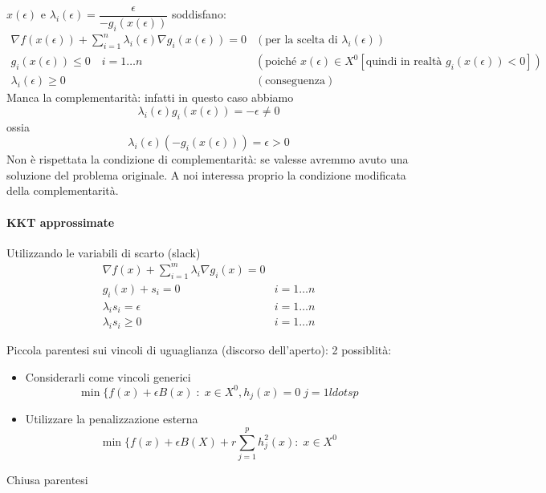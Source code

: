  $x(\epsilon)$ e $\lambda_i(\epsilon) =  \dfrac{\epsilon}{-g_i(x(\epsilon))}$
soddisfano:
$$ 
\begin{array}{ll}
\nabla f(x(\epsilon)) + \displaystyle \sum_{i=1}^{n}
\lambda_i(\epsilon) \nabla g_i(x(\epsilon)) = 0
& (\text{per la scelta di }\lambda_i(\epsilon)) \\
 g_i(x(\epsilon)) \leq 0 \quad i=1\ldots n  &
( \text{poich\'e } x(\epsilon) \in X^{0} [\text{quindi in realt\`a } g_i(x(\epsilon))<0 ]) \\
 \lambda_i(\epsilon) \geq 0   &  (\text{conseguenza})
\end{array}
$$
Manca la complementarit\`a: infatti in questo caso abbiamo
$$ \lambda_i(\epsilon) g_i(x(\epsilon)) = - \epsilon \neq 0 $$
ossia
$$ \lambda_i(\epsilon)(-g_i(x(\epsilon))) = \epsilon > 0$$
Non \`e  rispettata la condizione di complementarit\`a: se valesse
avremmo avuto una soluzione del problema originale.
A noi interessa proprio la condizione modificata della complementarit\`a.
\paragraph{KKT approssimate}
Utilizzando le variabili di scarto (slack)
 $$
\begin{array}{ll}
\nabla f(x) + \displaystyle \sum_{i=1}^{m} \lambda_i \nabla g_i(x) = 0  & \\
 g_i(x) + s_i = 0  &    i=1 \ldots n \\
 \lambda_i s_i = \epsilon &  i =1 \ldots n \\
  \lambda_i s_i \geq 0 \quad &  i= 1 \ldots n
\end{array}
$$

\begin{observation}
Piccola parentesi sui vincoli di uguaglianza (discorso dell'aperto):
2 possiblit\`a:
\begin{itemize}
\item Considerarli come vincoli generici
  $$ \min \{ f(x) + \epsilon B(x) \; : \; x \in X^{0}, h_j(x) = 0 \;
  j =  1 ldots p$$
\item Utilizzare la penalizzazione esterna
  $$ \min \{ f(x) + \epsilon B(X) + r \displaystyle \sum_{j=1}^{p} h_j^{2}(x)
  : \; x \in X^{0} $$
\end{itemize}
Chiusa parentesi
\end{observation}
